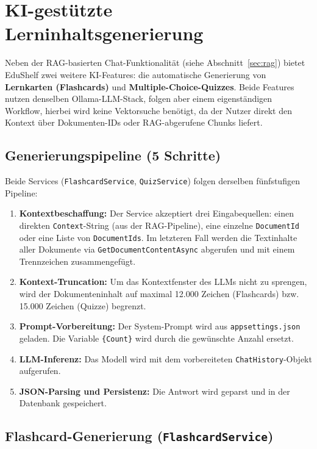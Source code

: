 \section{KI-gest\"utzte Lerninhaltsgenerierung}
\label{sec:aigeneration}

Neben der RAG-basierten Chat-Funktionalit\"at (siehe Abschnitt~\ref{sec:rag}) bietet EduShelf zwei weitere KI-Features: die automatische Generierung von \textbf{Lernkarten (Flashcards)} und \textbf{Multiple-Choice-Quizzes}. Beide Features nutzen denselben Ollama-LLM-Stack, folgen aber einem eigenst\"andigen Workflow, hierbei wird keine Vektorsuche ben\"otigt, da der Nutzer direkt den Kontext \"uber Dokumenten-IDs oder RAG-abgerufene Chunks liefert.

\subsection{Generierungspipeline (5 Schritte)}

Beide Services (\texttt{FlashcardService}, \texttt{QuizService}) folgen derselben f\"unfstufigen Pipeline:

\begin{enumerate}
    \item \textbf{Kontextbeschaffung:} Der Service akzeptiert drei Eingabequellen: einen direkten \texttt{Context}-String (aus der RAG-Pipeline), eine einzelne \texttt{DocumentId} oder eine Liste von \texttt{DocumentIds}. Im letzteren Fall werden die Textinhalte aller Dokumente via \texttt{GetDocumentContentAsync} abgerufen und mit einem Trennzeichen zusammengef\"ugt.
    \item \textbf{Kontext-Truncation:} Um das Kontextfenster des LLMs nicht zu sprengen, wird der Dokumenteninhalt auf maximal 12.000 Zeichen (Flashcards) bzw. 15.000 Zeichen (Quizze) begrenzt.
    \item \textbf{Prompt-Vorbereitung:} Der System-Prompt wird aus \texttt{appsettings.json} geladen. Die Variable \texttt{\{Count\}} wird durch die gew\"unschte Anzahl ersetzt.
    \item \textbf{LLM-Inferenz:} Das Modell wird mit dem vorbereiteten \texttt{ChatHistory}-Objekt aufgerufen.
    \item \textbf{JSON-Parsing und Persistenz:} Die Antwort wird geparst und in der Datenbank gespeichert.
\end{enumerate}

\subsection{Flashcard-Generierung (\texttt{FlashcardService})}

